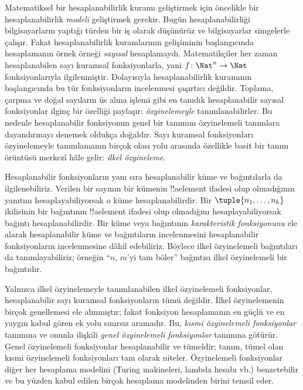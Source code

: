 \documentclass[../../../include/open-logic-section]{subfiles}
\begin{document}

Matematiksel bir hesaplanabilirlik kuramı geliştirmek için öncelikle
bir hesaplanabilirlik \emph{modeli} geliştirmek gerekir. Bugün
hesaplanabilirliği bilgisayarların yaptığı türden bir iş olarak
düşünürüz ve bilgisayarlar simgelerle çalışır. Fakat hesaplanabilirlik
kuramlarının gelişiminin başlangıcında hesaplamanın örnek örneği
\emph{sayısal} hesaplamaydı. Matematikçiler her zaman hesaplanabilen
sayı kuramsal fonksiyonlarla, yani $f\colon\Nat^n\to\Nat$
fonksiyonlarıyla ilgilenmiştir. Dolayısıyla hesaplanabilirlik kuramının
başlangıcında bu tür fonksiyonların incelenmesi şaşırtıcı değildir.
Toplama, çarpma ve doğal sayıların üs alma işlemi gibi en tanıdık
hesaplanabilir sayısal fonksiyonlar ilginç bir özelliği paylaşır:
\emph{özyinelemeyle} tanımlanabilirler. Bu nedenle hesaplanabilir
fonksiyonun genel bir tanımını özyinelemeli tanımlara dayandırmayı
denemek oldukça doğaldır. Sayı kuramsal fonksiyonları özyinelemeyle
tanımlamanın birçok olası yolu arasında özellikle basit bir tanım
örüntüsü merkezî hâle gelir: \emph{ilkel özyineleme}.

Hesaplanabilir fonksiyonların yanı sıra hesaplanabilir küme ve
bağıntılarla da ilgilenebiliriz. Verilen bir sayının bir kümenin
!!a{element} ifadesi olup olmadığının yanıtını hesaplayabiliyorsak o
küme hesaplanabilirdir. Bir $\tuple{n_1,\dots,n_k}$ ikilisinin bir
bağıntının !!a{element} ifadesi olup olmadığını hesaplayabiliyorsak
bağıntı hesaplanabilirdir. Bir küme veya bağıntının \emph{karakteristik
fonksiyonunu} ele alarak hesaplanabilir küme ve bağıntıların
incelenmesini hesaplanabilir fonksiyonların incelenmesine dâhil
edebiliriz. Böylece ilkel özyinelemeli bağıntıları da tanımlayabiliriz;
örneğin ``$n$, $m$'yi tam böler'' bağıntısı ilkel özyinelemeli bir
bağıntıdır.

Yalnızca ilkel özyinelemeyle tanımlanabilen ilkel özyinelemeli
fonksiyonlar, hesaplanabilir sayı kuramsal fonksiyonların tümü değildir.
İlkel özyinelemenin birçok genellemesi ele alınmıştır; fakat fonksiyon
hesaplamanın en güçlü ve en yaygın kabul gören ek yolu sınırsız
aramadır. Bu, \emph{kısmi özyinelemeli fonksiyonlar} tanımına ve onunla
ilişkili \emph{genel özyinelemeli fonksiyonlar} tanımına götürür. Genel
özyinelemeli fonksiyonlar hesaplanabilir ve tümeldir; tanım, tümel olan
kısmi özyinelemeli fonksiyonları tam olarak niteler. Özyinelemeli
fonksiyonlar diğer her hesaplama modelini (Turing makineleri, lambda
hesabı vb.) benzetebilir ve bu yüzden kabul edilen birçok hesaplama
modelinden birini temsil eder.
\end{document}
